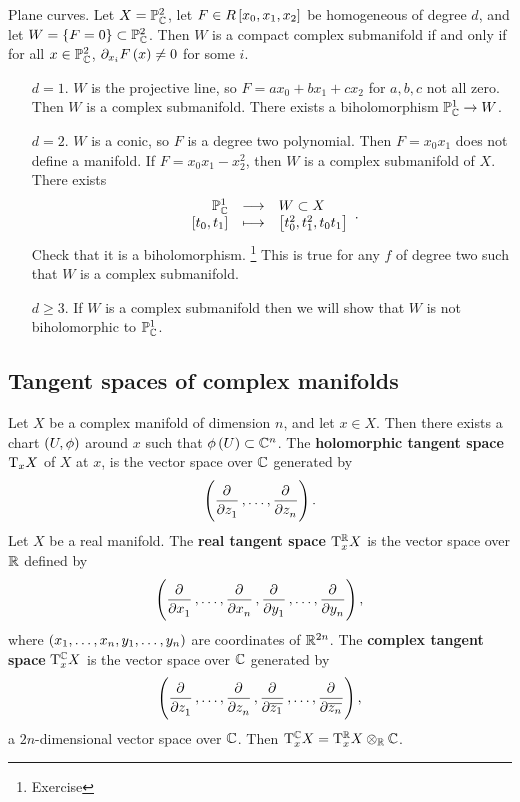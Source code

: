 \begin{example}
Plane curves. Let $ X = \mathbb{P}_{\mathbb{C}}^2 $, let $ F \in R\sbr{x_0, x_1, x_2} $ be homogeneous of degree $ d $, and let $ W = \cbr{F = 0} \subset \PP_\CC^2 $. Then $ W $ is a compact complex submanifold if and only if for all $ x \in \mathbb{P}_{\mathbb{C}}^2 $, $ \partial_{x_i} F\br{x} \ne 0 $ for some $ i $.
\begin{itemize}[leftmargin=0.5in]
\item[$ d = 1 $.] $ W $ is the projective line, so $ F = ax_0 + bx_1 + cx_2 $ for $ a, b, c $ not all zero. Then $ W $ is a complex submanifold. There exists a biholomorphism $ \mathbb{P}_{\mathbb{C}}^1 \to W $.
\item[$ d = 2 $.] $ W $ is a conic, so $ F $ is a degree two polynomial. Then $ F = x_0x_1 $ does not define a manifold. If $ F = x_0x_1 - x_2^2 $, then $ W $ is a complex submanifold of $ X $. There exists
$$ \function{\PP_\CC^1}{W \subset X}{\sbr{t_0, t_1}}{\sbr{t_0^2, t_1^2, t_0t_1}}. $$
Check that it is a biholomorphism. \footnote{Exercise} This is true for any $ f $ of degree two such that $ W $ is a complex submanifold.
\item[$ d \ge 3 $.] If $ W $ is a complex submanifold then we will show that $ W $ is not biholomorphic to $ \mathbb{P}_{\mathbb{C}}^1 $.
\end{itemize}
\end{example}

\subsection{Tangent spaces of complex manifolds}

\begin{definition}
Let $ X $ be a complex manifold of dimension $ n $, and let $ x \in X $. Then there exists a chart $ \br{U, \phi} $ around $ x $ such that $ \phi\br{U} \subset \CC^n $. The \textbf{holomorphic tangent space} $ \mathrm{T}_xX $ of $ X $ at $ x $, is the vector space over $ \mathbb{C} $ generated by
$$ \br{\dpd{}{z_1}, \dots, \dpd{}{z_n}}. $$
Let $ X $ be a real manifold. The \textbf{real tangent space} $ \mathrm{T}_x^{\mathbb{R}} X $ is the vector space over $ \mathbb{R} $ defined by
$$ \br{\dpd{}{x_1}, \dots, \dpd{}{x_n}, \dpd{}{y_1}, \dots, \dpd{}{y_n}}, $$
where $ \br{x_1, \dots, x_n, y_1, \dots, y_n} $ are coordinates of $ \mathbb{R}^{2n} $. The \textbf{complex tangent space} $ \mathrm{T}_x^{\mathbb{C}} X $ is the vector space over $ \mathbb{C} $ generated by
$$ \br{\dpd{}{z_1}, \dots, \dpd{}{z_n}, \dpd{}{\overline{z_1}}, \dots, \dpd{}{\overline{z_n}}}, $$
a $ 2n $-dimensional vector space over $ \mathbb{C} $. Then $ \mathrm{T}_x^{\mathbb{C}} X = \mathrm{T}_x^{\mathbb{R}} X \otimes_{\mathbb{R}} \mathbb{C} $.
\end{definition}

